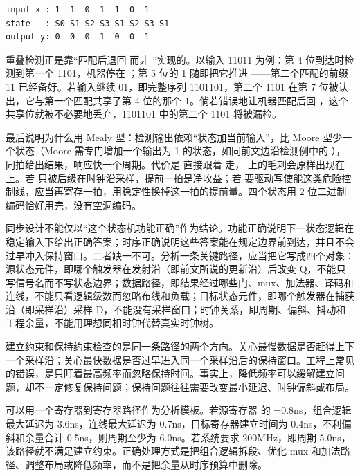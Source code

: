 \begin{lstlisting}
input x : 1  1  0  1  1  0  1
state   : S0 S1 S2 S3 S1 S2 S3 S1
output y: 0  0  0  1  0  0  1
\end{lstlisting}

重叠检测正是靠“匹配后退回  而非 ”实现的。以输入 11011 为例：第 4 位到达时检测到第一个 1101，机器停在 ；第 5 位的 1 随即把它推进 ——第二个匹配的前缀 11 已经备好。若输入继续 01，即完整序列 1101101，第二个 1101 在第 7 位被认出，它与第一个匹配共享了第 4 位的那个 1。倘若错误地让机器匹配后回 ，这个共享位就被不必要地丢弃，1101101 中的第二个 1101 将被漏检。

最后说明为什么用 Mealy 型：检测输出依赖“状态加当前输入”，比 Moore 型少一个状态（Moore 需专门增加一个输出为 1 的状态，如同前文边沿检测例中的 ），同拍给出结果，响应快一个周期。代价是  直接跟着  走， 上的毛刺会原样出现在  上。若  只被后级在时钟沿采样，提前一拍是净收益；若  要驱动写使能这类危险控制线，应当再寄存一拍，用稳定性换掉这一拍的提前量。四个状态用 2 位二进制编码恰好用完，没有空洞编码。


同步设计不能仅以“这个状态机功能正确”作为结论。功能正确说明下一状态逻辑在稳定输入下给出正确答案；时序正确说明这些答案能在规定边界前到达，并且不会过早冲入保持窗口。二者缺一不可。分析一条关键路径，应当把它写成四个对象：源状态元件，即哪个触发器在发射沿（即前文所说的更新沿）后改变 Q，不能只写信号名而不写状态边界；数据路径，即结果经过哪些门、mux、加法器、译码和连线，不能只看逻辑级数而忽略布线和负载；目标状态元件，即哪个触发器在捕获沿（即采样沿）采样 D，不能没有采样窗口；时钟关系，即周期、偏斜、抖动和工程余量，不能用理想同相时钟代替真实时钟树。

建立约束和保持约束检查的是同一条路径的两个方向。关心最慢数据是否赶得上下一个采样沿；关心最快数据是否过早进入同一个采样沿后的保持窗口。工程上常见的错误，是只盯着最高频率而忽略保持时间。事实上，降低频率可以缓解建立问题，却不一定修复保持问题；保持问题往往需要改变最小延迟、时钟偏斜或布局。

可以用一个寄存器到寄存器路径作为分析模板。若源寄存器  的 =0.8ns，组合逻辑最大延迟为 3.6ns，连线最大延迟为 0.7ns，目标寄存器建立时间为 0.4ns，不利偏斜和余量合计 0.5ns，则周期至少为 6.0ns。若系统要求 200MHz，即周期 5.0ns，该路径就不满足建立约束。正确处理方式是把组合逻辑拆段、优化 mux 和加法路径、调整布局或降低频率，而不是把余量从时序预算中删除。

